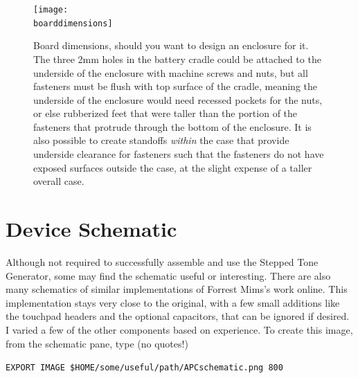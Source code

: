 \documentclass[12pt]{article}
\newcommand{\+}{\item}		%
\newcommand{\boarddimensions}{dimensions.png}
\begin{document}
\begin{figure}
\begin{center}
\texttt{[image: \\boarddimensions]}
\end{center}
\caption{Board dimensions, should you want to design an enclosure for it. The three 2mm holes in the battery cradle could be attached to the underside of the enclosure with machine screws and nuts, but all fasteners must be flush with top surface of the cradle, meaning the underside of the enclosure would need recessed pockets for the nuts, or else rubberized feet that were taller than the portion of the fasteners that protrude through the bottom of the enclosure. It is also possible to create standoffs \emph{within} the case that provide underside clearance for fasteners such that the fasteners do not have exposed surfaces outside the case, at the slight expense of a taller overall case.}
\end{figure}





\clearpage 
\section{Device Schematic}

Although not required to successfully assemble and use the Stepped Tone Generator, some may find the schematic useful or interesting. There are also many schematics of similar implementations of Forrest Mims's work online. This implementation stays very close to the original, with a few small additions like the touchpad headers and the optional capacitors, that can be ignored if desired. I varied a few of the other components based on experience. To create this image, from the schematic pane, type (no quotes!)

\verb|EXPORT IMAGE $HOME/some/useful/path/APCschematic.png 800|

\bigskip
\end{document}
